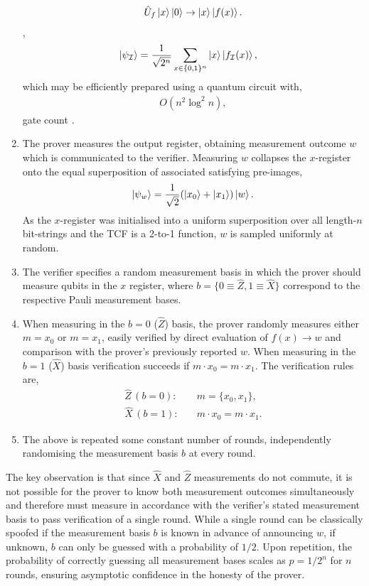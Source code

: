 \begin{enumerate}
{\begin{align}
			      \hat{U}_f\ket{x}\ket{0}\to\ket{x}\ket{f(x)}.\nonumber
		      \end{align}},
	      \begin{align}
		      \ket{\psi_\mathcal{I}} & = \frac{1}{\sqrt{2^n}} \sum_{x\in\{0,1\}^n} \ket{x} \ket{f_\mathcal{I}(x)},\nonumber
	      \end{align}
	      which may be efficiently prepared using a quantum circuit with,
	      \begin{align}
		      O(n^2 \log^2 n),
	      \end{align}
	      gate count \cite{ClassVerifQA}.
	\item The prover measures the output register, obtaining measurement outcome $w$ which is communicated to the verifier. Measuring $w$ collapses the $x$-register onto the equal superposition of associated satisfying pre-images,
	      \begin{align}
		      \ket{\psi_w} = \frac{1}{\sqrt{2}}(\ket{x_0}+\ket{x_1})\ket{w}.
	      \end{align}
	      As the $x$-register was initialised into a uniform superposition over all length-$n$ bit-strings and the TCF is a 2-to-1 function, $w$ is sampled uniformly at random.
	\item The verifier specifies a random measurement basis in which the prover should measure qubits in the $x$ register, where $b=\{0\equiv \hat{Z},1\equiv\hat{X} \}$ correspond to the respective Pauli measurement bases.
	\item When measuring in the $b=0$ ($\hat{Z}$) basis, the prover randomly measures either $m=x_0$ or $m=x_1$, easily verified by direct evaluation of \mbox{$f(x)\to w$} and comparison with the prover's previously reported $w$. When measuring in the $b=1$ ($\hat{X}$) basis verification succeeds if \mbox{$m\cdot x_0 = m\cdot x_1$}. The verification rules are,
	      \begin{align}
		      \hat{Z}\, (b=0): & \quad m=\{x_0,x_1\},\nonumber  \\
		      \hat{X}\, (b=1): & \quad m\cdot x_0 = m\cdot x_1.
	      \end{align}
	\item The above is repeated some constant number of rounds, independently randomising the measurement basis $b$ at every round.
\end{enumerate}

The key observation is that since $\hat{X}$ and $\hat{Z}$ measurements do not commute, it is not possible for the prover to know both measurement outcomes simultaneously and therefore must measure in accordance with the verifier's stated measurement basis to pass verification of a single round. While a single round can be classically spoofed if the measurement basis $b$ is known in advance of announcing $w$, if unknown, $b$ can only be guessed with a probability of $1/2$. Upon repetition, the probability of correctly guessing all measurement bases scales as \mbox{$p=1/2^n$} for $n$ rounds, ensuring asymptotic confidence in the honesty of the prover.

